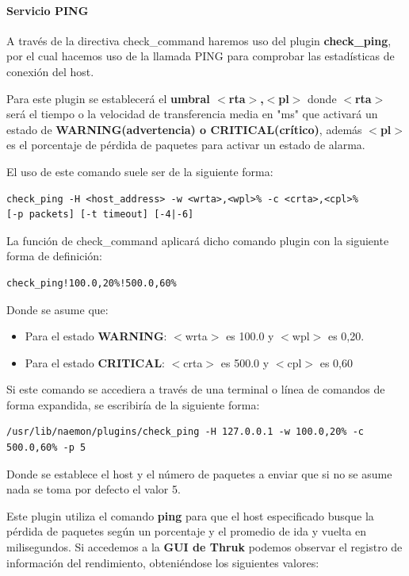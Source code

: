 \paragraph{Servicio PING}

A través de la directiva check\_command haremos uso del plugin \textbf{check\_ping}, por el cual hacemos uso de la llamada PING para comprobar las estadísticas de conexión del host.

Para este plugin se establecerá el \textbf{umbral $<$rta$>$,$<$pl$>$} donde \textbf{$<$rta$>$} será el tiempo o la velocidad de transferencia media en "ms" que activará un estado de \textbf{WARNING(advertencia) o CRITICAL(crítico)}, además \textbf{$<$pl$>$} es el porcentaje de pérdida de paquetes para activar un estado de alarma.

El uso de este comando suele ser de la siguiente forma:
\begin{lstlisting}
check_ping -H <host_address> -w <wrta>,<wpl>% -c <crta>,<cpl>%
[-p packets] [-t timeout] [-4|-6]

\end{lstlisting}

La función de check\_command aplicará dicho comando plugin con la siguiente forma de definición:
\begin{lstlisting}
check_ping!100.0,20%!500.0,60%
\end{lstlisting} 

Donde se asume que:
\begin{itemize}
	\item Para el estado \textbf{WARNING}: $<$wrta$>$ es 100.0 y $<$wpl$>$ es 0,20.
	\item Para el estado \textbf{CRITICAL}: $<$crta$>$ es 500.0 y $<$cpl$>$ es 0,60
\end{itemize}

Si este comando se accediera a través de una terminal o línea de comandos de forma expandida, se escribiría de la siguiente forma:

\begin{lstlisting}
/usr/lib/naemon/plugins/check_ping -H 127.0.0.1 -w 100.0,20% -c 500.0,60% -p 5
\end{lstlisting}

Donde se establece el host y el número de paquetes a enviar que si no se asume nada se toma por defecto el valor 5.

Este plugin utiliza el comando \textbf{ping} para que el host especificado busque la pérdida de paquetes según un porcentaje y el promedio de ida y vuelta en milisegundos.
\newpage
Si accedemos a la \textbf{GUI de Thruk} podemos observar el registro de información del rendimiento, obteniéndose los siguientes valores:
 
